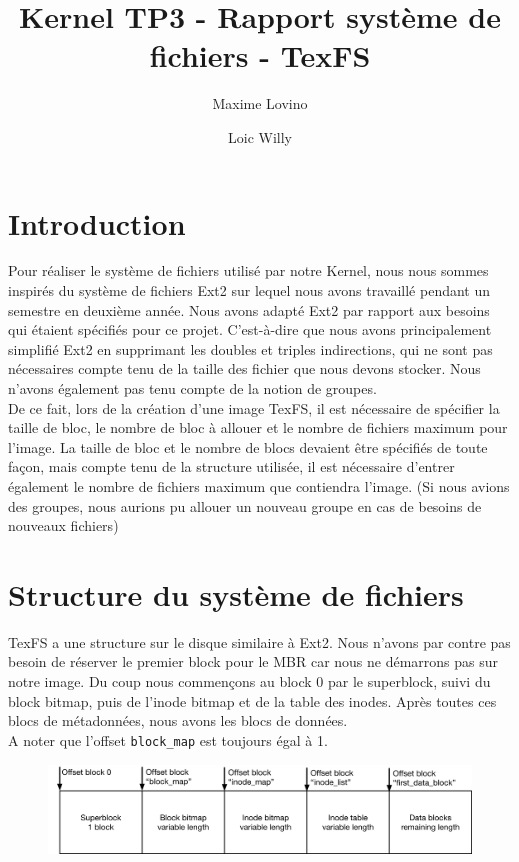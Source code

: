 \documentclass{article}
\title{Kernel TP3 - Rapport système de fichiers - TexFS}
\author{Maxime Lovino \and Loic Willy}
\begin{document}
\maketitle
\newpage
\section{Introduction}
Pour réaliser le système de fichiers utilisé par notre Kernel, nous nous sommes inspirés du système de fichiers Ext2 sur lequel nous avons travaillé pendant un semestre en deuxième année. Nous avons adapté Ext2 par rapport aux besoins qui étaient spécifiés pour ce projet. C'est-à-dire que nous avons principalement simplifié Ext2 en supprimant les doubles et triples indirections, qui ne sont pas nécessaires compte tenu de la taille des fichier que nous devons stocker. Nous n'avons également pas tenu compte de la notion de groupes.\\

De ce fait, lors de la création d'une image TexFS, il est nécessaire de spécifier la taille de bloc, le nombre de bloc à allouer et le nombre de fichiers maximum pour l'image. La taille de bloc et le nombre de blocs devaient être spécifiés de toute façon, mais compte tenu de la structure utilisée, il est nécessaire d'entrer également le nombre de fichiers maximum que contiendra l'image. (Si nous avions des groupes, nous aurions pu allouer un nouveau groupe en cas de besoins de nouveaux fichiers)
\section{Structure du système de fichiers}
TexFS a une structure sur le disque similaire à Ext2. Nous n'avons par contre pas besoin de réserver le premier block pour le MBR car nous ne démarrons pas sur notre image. Du coup nous commençons au block 0 par le superblock, suivi du block bitmap, puis de l'inode bitmap et de la table des inodes. Après toutes ces blocs de métadonnées, nous avons les blocs de données. \\

A noter que l'offset \verb+block_map+ est toujours égal à 1.
\begin{figure}[H]
    \centering
    \includegraphics[width=\textwidth]{FS_disk_structure.png}
\end{figure}
\end{document}
